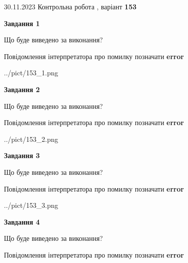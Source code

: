\documentclass[12pt, ukrainian]{article}
\begin{document}
{{30.11.2023 Контрольна робота , варіант  \No \textbf { 153 }\par}}
{




{\begin {center}\textbf{Завдання 1}\end {center}}\par
Що буде виведено за виконання? \par
Повідомлення інтерпретатора про помилку позначати \textbf{error}

\begin{center}
	{../pict/153_1.png}
\end{center}
\newpage

{\begin {center}\textbf{Завдання 2}\end {center}}\par
Що буде виведено за виконання? \par
Повідомлення інтерпретатора про помилку позначати \textbf{error}

\begin{center}
	{../pict/153_2.png}
\end{center}
\newpage

{\begin {center}\textbf{Завдання 3}\end {center}}\par
Що буде виведено за виконання? \par
Повідомлення інтерпретатора про помилку позначати \textbf{error}

\begin{center}
	{../pict/153_3.png}
\end{center}
\newpage

{\begin {center}\textbf{Завдання 4}\end {center}}\par
Що буде виведено за виконання? \par
Повідомлення інтерпретатора про помилку позначати \textbf{error}

}
\end{document}
